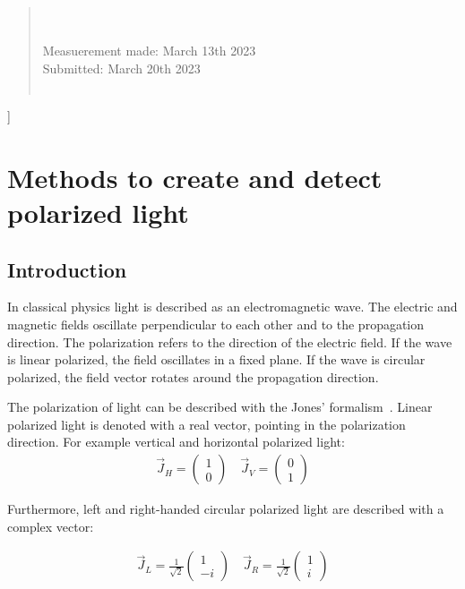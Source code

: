 \documentclass[a4paper,10pt,twocolumn]{article}
\begin{document}
{\begin{abstract}
        \\
        \\
        Measuerement made: March 13th 2023\\       %
        Submitted: March 20th 2023                %
        \\
        \\
    \end{abstract}
    }] 
    \section{Methods to create and detect polarized light}
    \subsection{Introduction}
    In classical physics light is described as an electromagnetic wave.
    The electric and magnetic fields oscillate perpendicular to each other and to the propagation direction.
    The polarization refers to the direction of the electric field.
    If the wave is linear polarized, the field oscillates in a fixed plane.
    If the wave is circular polarized, the field vector rotates around the propagation direction.
    
    The polarization of light can be described with the Jones' formalism~\cite{gerth}.
    Linear polarized light is denoted with a real vector, pointing in the polarization direction.
    For example vertical and horizontal polarized light:
    \begin{align*}
        \vec{J}_H = \begin{pmatrix} 1 \\ 0 \end{pmatrix} \quad
        \vec{J}_V = \begin{pmatrix} 0 \\ 1 \end{pmatrix}
    \end{align*}
    
    Furthermore, left and right-handed circular polarized light are described with a complex vector:

    \begin{align*}
        \vec{J}_L = \frac{1}{\sqrt {2}} \begin{pmatrix} 1 \\ -i \end{pmatrix} \quad
        \vec{J}_R = \frac{1}{\sqrt {2}} \begin{pmatrix} 1 \\ i \end{pmatrix}
    \end{align*}
    
\end{document}

